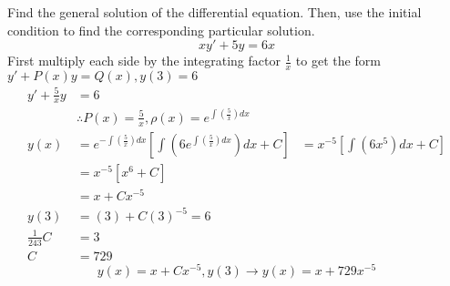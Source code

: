 \documentclass{article}
\begin{document}
Find the general solution of the differential equation. Then, use the initial condition to find the corresponding particular solution.
$$ xy' + 5y = 6x $$
First multiply each side by the integrating factor $ \frac{1}{x} $ to get the form $ y' + P(x)y = Q(x), y(3) = 6 $
\begin{align*}
    y' + \frac{5}{x}y & = 6 \\
                      & \therefore P(x) = \frac{5}{x}, \rho(x) = e^{\int(\frac{5}{x})dx} \\
    y(x) & = e^{-\int(\frac{5}{x})dx} \left[ \int \left( 6e^{\int(\frac{5}{x})dx} \right) dx + C \right]
         & = x^{-5} \left[ \int (6x^5)dx + C \right] \\
         & = x^{-5} \left[ x^6 + C \right] \\
         & = x + Cx^{-5} \\
    y(3) & = (3) + C(3)^{-5} = 6 \\
    \frac{1}{243}C & = 3 \\
    C & = 729
\end{align*}
\begin{equation*}
    \boxed{
        y(x) = x + Cx^{-5}, y(3) \rightarrow y(x) = x + 729x^{-5}
    }
\end{equation*}
\end{document}

